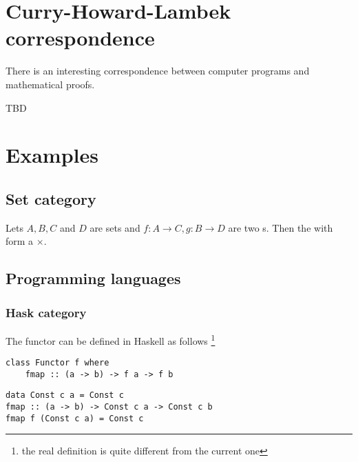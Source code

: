 \section{Curry-Howard-Lambek correspondence}
There is an interesting correspondence between computer programs and
mathematical proofs.

TBD

\section{Examples}

\subsection{\textbf{Set} category}

\begin{example}
\label{ex:product_bifunctor}
Lets $A,B,C$ and $D$ are sets and $f: A \to C, g: B \to D$ are two
s. Then the 
with  form a
 $\times$.
\end{example}

\subsection{Programming languages}

\subsubsection{\textbf{Hask} category}
The functor can be defined in Haskell as follows
\footnote{the real definition is quite different from the current one}
\begin{example}
\label{ex:functor_haskell}
\begin{verbatim}
class Functor f where
    fmap :: (a -> b) -> f a -> f b
\end{verbatim} 
\end{example}


\begin{example}
\label{ex:terminal_object_cat_hask}
\begin{verbatim}
data Const c a = Const c
fmap :: (a -> b) -> Const c a -> Const c b
fmap f (Const c a) = Const c
\end{verbatim}
\end{example}

